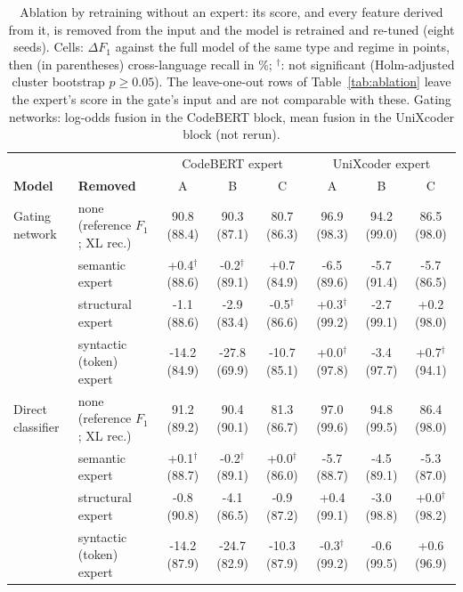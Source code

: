\begin{table}[t]
\centering
\caption{Ablation by retraining without an expert: its score, and every feature derived from it, is removed from the input and the model is retrained and re-tuned (eight seeds). Cells: $\Delta F_1$ against the full model of the same type and regime in points, then (in parentheses) cross-language recall in \%; $^\dagger$: not significant (Holm-adjusted cluster bootstrap $p\ge0.05$). The leave-one-out rows of Table~\ref{tab:ablation} leave the expert's score in the gate's input and are not comparable with these. Gating networks: log-odds fusion in the CodeBERT block, mean fusion in the UniXcoder block (not rerun).}
\label{tab:ablation-retrained}
\scriptsize
\setlength{\tabcolsep}{3pt}
\begin{tabular}{ll|ccc|ccc}
\toprule
 & & \multicolumn{3}{c|}{CodeBERT expert} & \multicolumn{3}{c}{UniXcoder expert} \\
\textbf{Model} & \textbf{Removed} & A & B & C & A & B & C \\
\midrule
Gating network & none (reference $F_1$; XL rec.) & 90.8 (88.4) & 90.3 (87.1) & 80.7 (86.3) & 96.9 (98.3) & 94.2 (99.0) & 86.5 (98.0) \\
 & semantic expert & +0.4$^\dagger$ (88.6) & -0.2$^\dagger$ (89.1) & +0.7 (84.9) & -6.5 (89.6) & -5.7 (91.4) & -5.7 (86.5) \\
 & structural expert & -1.1 (88.6) & -2.9 (83.4) & -0.5$^\dagger$ (86.6) & +0.3$^\dagger$ (99.2) & -2.7 (99.1) & +0.2 (98.0) \\
 & syntactic (token) expert & -14.2 (84.9) & -27.8 (69.9) & -10.7 (85.1) & +0.0$^\dagger$ (97.8) & -3.4 (97.7) & +0.7$^\dagger$ (94.1) \\
\midrule
Direct classifier & none (reference $F_1$; XL rec.) & 91.2 (89.2) & 90.4 (90.1) & 81.3 (86.7) & 97.0 (99.6) & 94.8 (99.5) & 86.4 (98.0) \\
 & semantic expert & +0.1$^\dagger$ (88.7) & -0.2$^\dagger$ (89.1) & +0.0$^\dagger$ (86.0) & -5.7 (88.7) & -4.5 (89.1) & -5.3 (87.0) \\
 & structural expert & -0.8 (90.8) & -4.1 (86.5) & -0.9 (87.2) & +0.4 (99.1) & -3.0 (98.8) & +0.0$^\dagger$ (98.2) \\
 & syntactic (token) expert & -14.2 (87.9) & -24.7 (82.9) & -10.3 (87.9) & -0.3$^\dagger$ (99.2) & -0.6 (99.5) & +0.6 (96.9) \\
\bottomrule
\end{tabular}
\end{table}